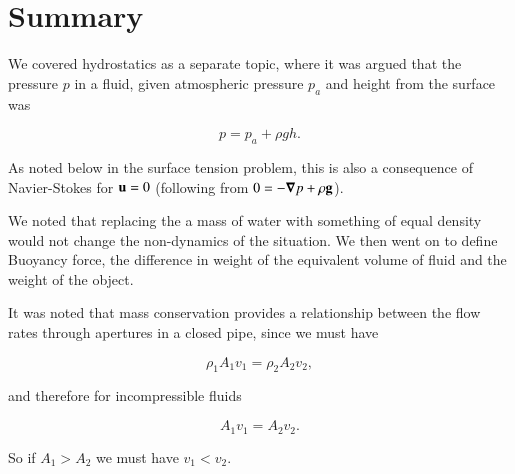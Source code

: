 \section{Summary}

We covered hydrostatics as a separate topic, where it was argued that the pressure $p$ in a fluid, given atmospheric pressure $p_a$ and height from the surface was

\begin{equation}\label{eqn:continuumFluidsReview:1850}
p = p_a + \rho g h.
\end{equation}

As noted below in the surface tension problem, this is also a consequence of Navier-Stokes for $\mathbf{u} = 0$ (following from $0 = -\boldsymbol{\nabla} p + \rho \mathbf{g}$).

We noted that replacing the a mass of water with something of equal density would not change the non-dynamics of the situation.  We then went on to define Buoyancy force, the difference in weight of the equivalent volume of fluid and the weight of the object.


It was noted that mass conservation provides a relationship between the flow rates through apertures in a closed pipe, since we must have

\begin{equation}\label{eqn:continuumFluidsReview:1870}
\rho_1 A_1 v_1 = \rho_2 A_2 v_2,
\end{equation}

and therefore for incompressible fluids

\begin{equation}\label{eqn:continuumFluidsReview:1890}
A_1 v_1 = A_2 v_2.
\end{equation}

So if $A_1 > A_2$ we must have $v_1 < v_2$.
